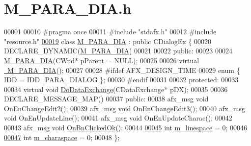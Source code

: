 \hypertarget{_m___p_a_r_a___d_i_a_8h_source}{}\section{M\+\_\+\+P\+A\+R\+A\+\_\+\+D\+I\+A.\+h}
\label{_m___p_a_r_a___d_i_a_8h_source}

\begin{DoxyCode}
00001 
00010 \textcolor{preprocessor}{#pragma once}
00011 \textcolor{preprocessor}{#include "stdafx.h"}
00012 \textcolor{preprocessor}{#include "resource.h"}
\hyperlink{class_m___p_a_r_a___d_i_a}{00019} \textcolor{keyword}{class }\hyperlink{class_m___p_a_r_a___d_i_a}{M\_PARA\_DIA} : \textcolor{keyword}{public} CDialogEx \{
00020   DECLARE\_DYNAMIC(\hyperlink{class_m___p_a_r_a___d_i_a}{M\_PARA\_DIA})
00021 
00022  \textcolor{keyword}{public}:
00023 
00024   \hyperlink{class_m___p_a_r_a___d_i_a_a48afe90e65a6b5b795660771a979dead}{M\_PARA\_DIA}(CWnd* pParent = NULL);  
00025   
00026   \textcolor{keyword}{virtual} \hyperlink{class_m___p_a_r_a___d_i_a_a773b615a0195eef82f905a622b986730}{~M\_PARA\_DIA}();
00027 
00028 \textcolor{preprocessor}{#ifdef AFX\_DESIGN\_TIME}
00029   \textcolor{keyword}{enum} \{ IDD = IDD\_PARA\_DIALOG \};
00030 \textcolor{preprocessor}{#endif}
00031 
00032  \textcolor{keyword}{protected}:
00033   
00034   \textcolor{keyword}{virtual} \textcolor{keywordtype}{void} \hyperlink{class_m___p_a_r_a___d_i_a_a7d7ff9f843610a3ddccd12da36df7751}{DoDataExchange}(CDataExchange* pDX);
00035 
00036   DECLARE\_MESSAGE\_MAP()
00037  \textcolor{keyword}{public}:
00038   afx\_msg \textcolor{keywordtype}{void} OnEnChangeEdit2();
00039   afx\_msg \textcolor{keywordtype}{void} OnEnChangeEdit3();
00040   afx\_msg \textcolor{keywordtype}{void} OnEnUpdateLine();
00041   afx\_msg \textcolor{keywordtype}{void} OnEnUpdateCharac();
00042   
00043   afx\_msg \textcolor{keywordtype}{void} \hyperlink{class_m___p_a_r_a___d_i_a_afffa042b90b31b6d38bf33792096d908}{OnBnClickedOk}();
00044   
\hyperlink{class_m___p_a_r_a___d_i_a_aea31fe9cfbcfd5a9c9d218a0f5a821f7}{00045}   \textcolor{keywordtype}{int} \hyperlink{class_m___p_a_r_a___d_i_a_aea31fe9cfbcfd5a9c9d218a0f5a821f7}{m\_linespace} = 0;
00046   
\hyperlink{class_m___p_a_r_a___d_i_a_abdddacb23484b11c4ddf7be621fecd74}{00047}   \textcolor{keywordtype}{int} \hyperlink{class_m___p_a_r_a___d_i_a_abdddacb23484b11c4ddf7be621fecd74}{m\_charaspace} = 0;
00048 \};
\end{DoxyCode}
